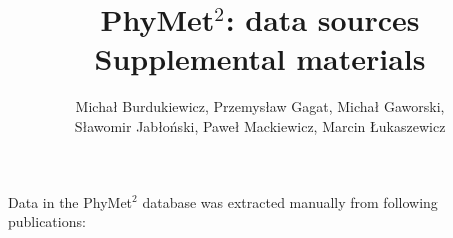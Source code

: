 \documentclass{article}
\author{Micha\l{} Burdukiewicz, Przemys\l{}aw Gagat, Micha\l{} Gaworski, \\
S\l{}awomir Jab\l{}o\'nski, Pawe\l{} Mackiewicz, Marcin \L{}ukaszewicz}
\date{}
\title{PhyMet$^2$: data sources \\
\large Supplemental materials}
\begin{document}
\maketitle

Data in the PhyMet$^2$ database was extracted manually from following 
publications:

\nocite{*}


\end{document}
